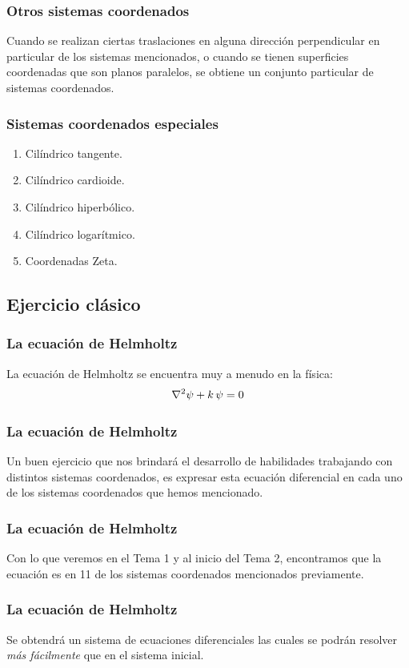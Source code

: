 \documentclass[12pt]{beamer}
\begin{document}
\begin{frame}
\frametitle{Otros sistemas coordenados}
Cuando se realizan ciertas traslaciones en alguna dirección perpendicular en particular de los sistemas mencionados, o cuando se tienen superficies coordenadas que son planos paralelos, \pause se obtiene un conjunto particular de sistemas coordenados.
\end{frame}
\begin{frame}
\frametitle{Sistemas coordenados especiales}
\begin{enumerate}[<+->]
\item Cilíndrico tangente.
\item Cilíndrico cardioide.
\item Cilíndrico hiperbólico.
\item Cilíndrico logarítmico.
\item Coordenadas Zeta.
\end{enumerate}
\end{frame}

\subsection{Ejercicio clásico}

\begin{frame}
\frametitle{La ecuación de Helmholtz}
La ecuación de Helmholtz se encuentra muy a menudo en la física:
\pause
\begin{align*}
\laplacian{\psi} + k \, \psi = 0
\end{align*}
\end{frame}
\begin{frame}
\frametitle{La ecuación de Helmholtz}
Un buen ejercicio que nos brindará el desarrollo de habilidades trabajando con distintos sistemas coordenados, es expresar esta ecuación diferencial en cada uno de los sistemas coordenados que hemos mencionado.
\end{frame}
\begin{frame}
\frametitle{La ecuación de Helmholtz}
Con lo que veremos en el Tema 1 y al inicio del Tema 2, encontramos que la ecuación es  en 11 de los sistemas coordenados mencionados previamente.
\end{frame}
\begin{frame}
\frametitle{La ecuación de Helmholtz}
Se obtendrá un sistema de ecuaciones diferenciales las cuales se podrán resolver \emph{más fácilmente} que en el sistema inicial.
\end{frame}
\end{document}
